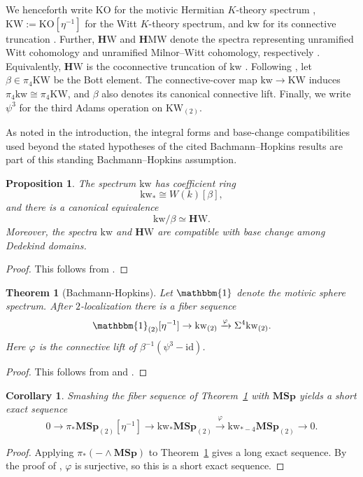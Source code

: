 \documentclass[a4paper]{amsart}
\theoremstyle{plain}
\newtheorem{theorem}[subsubsection]{Theorem}
\newtheorem{proposition}[subsubsection]{Proposition}
\newtheorem{corollary}[subsubsection]{Corollary}
\theoremstyle{definition}
\newcommand{\MSp}{\mathbf{MSp}}
\newcommand{\etainv}{\eta^{-1}}
\newcommand{\HW}{\mathbf{H}\mathrm{W}}
\newcommand{\HMW}{\mathbf{H}\mathrm{MW}}
\newcommand{\KW}{\mathrm{KW}}
\newcommand{\KO}{\mathrm{KO}}
\newcommand{\kw}{\mathrm{kw}}
\begin{document}
We henceforth write $\KO$ for the motivic Hermitian $K$-theory spectrum \cite{calmes2024a,kumar2024construction}, $\KW:=\KO[\etainv]$ for the Witt $K$-theory spectrum, and $\kw$ for its connective truncation \cite{bachmann2022eta}. Further, $\HW$ and $\HMW$ denote the spectra representing unramified Witt cohomology and unramified Milnor--Witt cohomology, respectively \cite{deglise2025homological}. Equivalently, $\HW$ is the coconnective truncation of $\kw$ \cite[Corollary~4.11]{bachmann2022eta}. Following \cite[Sections~3.2.5 and 6.3.2]{bachmann2021eta}, let $\beta\in\pi_4\KW$ be the Bott element. The connective-cover map $\kw\to\KW$ induces $\pi_4\kw\cong\pi_4\KW$, and $\beta$ also denotes its canonical connective lift. Finally, we write $\psi^3$ for the third Adams operation \cite{bachmann2021norm,fasel2025the} on $\KW_{(2)}$.

As noted in the introduction, the integral forms and base-change compatibilities used beyond the stated hypotheses of the cited Bachmann--Hopkins results are part of this standing Bachmann--Hopkins assumption.

\begin{proposition}\label{prop:kw-to-hw}
	The spectrum $\kw$ has coefficient ring
	\[
		\kw_*\cong W(k)[\beta],
	\]
	and there is a canonical equivalence
	\[
		\kw/\beta \simeq \HW.
	\]
	Moreover, the spectra $\kw$ and $\HW$ are compatible with base change among Dedekind domains.
\end{proposition}
\begin{proof}
	This follows from \cite[Lemma~4.4 and Theorem~4.5]{bachmann2022eta}.
\end{proof}

\begin{theorem}[Bachmann-Hopkins]\label{thm:kw-fiber-sequence}
	Let $\mathbbm{1}$ denote the motivic sphere spectrum. After $2$-localization there is a fiber sequence
	\[
		\mathbbm{1}_{(2)}[\etainv]\to \kw_{(2)} \xrightarrow{\varphi} \Sigma^{4}\kw_{(2)}.
	\]
	Here $\varphi$ is the connective lift of $\beta^{-1}(\psi^{3}-\mathrm{id})$.
\end{theorem}
\begin{proof}
	This follows from \cite[Theorem~4.12]{bachmann2022eta} and \cite[Theorem~7.8]{bachmann2021eta}.
\end{proof}

\begin{corollary}\label{cor:msp-kw-short-exact-sequence}
	Smashing the fiber sequence of Theorem~\ref{thm:kw-fiber-sequence} with $\MSp$ yields a short exact sequence
	\[
		0 \to \pi_* \MSp_{(2)}[\etainv] \to \kw_*\MSp_{(2)} \xrightarrow{\varphi} \kw_{*-4}\MSp_{(2)} \to 0.
	\]
\end{corollary}
\begin{proof}
	Applying $\pi_*(-\wedge \MSp)$ to Theorem~\ref{thm:kw-fiber-sequence} gives a long exact sequence. By the proof of \cite[Theorem 8.8]{bachmann2021eta}, $\varphi$ is surjective, so this is a short exact sequence.
\end{proof}
\end{document}
